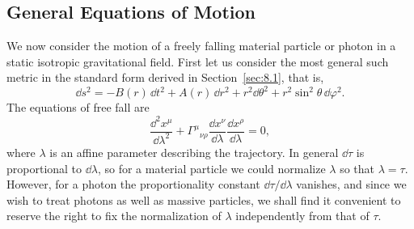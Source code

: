 
\subsection{General Equations of Motion}\label{sec:8.4}

We now consider the motion of a freely falling material particle or photon
in a static isotropic gravitational field. First let us consider the most
general such metric in the standard form derived in Section~\ref{sec:8.1},
that is,
\begin{equation}
  \dd s^2
  =
  -B(r)\,\dd t^2+A(r)\,\dd r^2
  +r^2\dd\theta^2+r^2\sin^2\theta\,\dd\varphi^2.
  \tag{8.4.1}\label{eq:8.4.1}
\end{equation}
The equations of free fall are
\begin{equation}
  \frac{\dd^2x^\mu}{\dd\lambda^2}
  +\Gamma^\mu{}_{\nu\rho}
  \frac{\dd x^\nu}{\dd\lambda}\frac{\dd x^\rho}{\dd\lambda}
  =0,
  \tag{8.4.2}\label{eq:8.4.2}
\end{equation}
where \(\lambda\) is an affine parameter describing the trajectory. In
general \(\dd\tau\) is proportional to \(\dd\lambda\), so for a material
particle we could normalize \(\lambda\) so that \(\lambda=\tau\). However,
for a photon the proportionality constant \(\dd\tau/\dd\lambda\) vanishes, and
since we wish to treat photons as well as massive particles, we shall find
it convenient to reserve the right to fix the normalization of \(\lambda\)
independently from that of \(\tau\).


